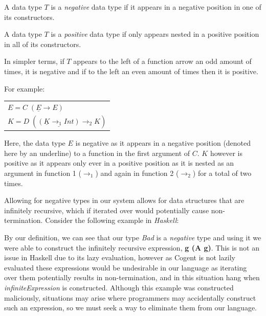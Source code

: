 \theoremstyle{definition}
\begin{definition}
    A data type $T$ is a \textit{negative} data type if it appears in a negative position 
    in one of its constructors.
\end{definition}

\theoremstyle{definition}
\begin{definition}
    A data type $T$ is a \textit{positive} data type if only appears nested in a positive position
    in all of its constructors.
\end{definition}

In simpler terms, if $T$ appears to the left of a function arrow an odd amount of times, it is negative and if
to the left an even amount of times then it is positive.

For example:

\begin{center}
    \begin{tabular}{l}
        $E = C\; (\underline{E} \rightarrow E)$ \\
        $K = D\; (\underline{(\underline{K} \rightarrow_1 Int)} \rightarrow_2 K)$
    \end{tabular} 
\end{center}

Here, the data type $E$ is negative as it appears in a negative position (denoted here by an underline)
to a function in the first argument of $C$.
$K$ however is positive as it appears only ever in a positive position as it is nested as an argument
in function 1 ($\rightarrow_1$) and again in function 2 ($\rightarrow_2$) for a total of two times.

Allowing for negative types in our system allows for data structures that are infinitely recursive,
which if iterated over would potentially cause non-termination. Consider
the following example in \textit{Haskell}:



By our definition, we can see that our type \textit{Bad} is a \textit{negative} type and using it we were able
to construct the infinitely recursive expression, \textbf{g (A g)}.
This is not an issue in Haskell due to its lazy evaluation,
however as Cogent is not lazily evaluated these expressions would be undesirable in
our language as iterating over them potentially results in non-termination, and in this
situation hang when \textit{infiniteExpression} is constructed.
Although this example was constructed maliciously, situations may arise where
programmers may accidentally construct such an expression, so we must seek a way to
eliminate them from our language.

